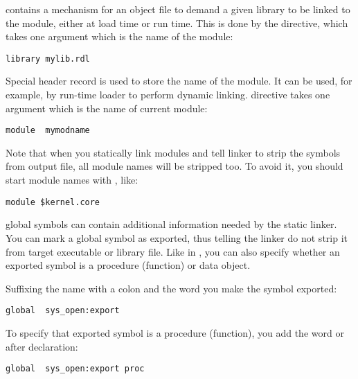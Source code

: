  contains a mechanism for an object file to demand a given
library to be linked to the module, either at load time or run time.
This is done by the  directive, which takes one argument
which is the name of the module:

\begin{lstlisting}
library mylib.rdl
\end{lstlisting}


Special  header record is used to store the name of the module.
It can be used, for example, by run-time loader to perform dynamic
linking.  directive takes one argument which is the name
of current module:

\begin{lstlisting}
module  mymodname
\end{lstlisting}

Note that when you statically link modules and tell linker to strip
the symbols from output file, all module names will be stripped too.
To avoid it, you should start module names with \code{\$},
like:

\begin{lstlisting}
module $kernel.core
\end{lstlisting}


 global symbols can contain additional information needed by
the static linker. You can mark a global symbol as exported, thus
telling the linker do not strip it from target executable or library
file. Like in , you can also specify whether an exported symbol
is a procedure (function) or data object.

Suffixing the name with a colon and the word  you make the
symbol exported:

\begin{lstlisting}
global  sys_open:export
\end{lstlisting}

To specify that exported symbol is a procedure (function), you add the
word  or  after declaration:

\begin{lstlisting}
global  sys_open:export proc
\end{lstlisting}

